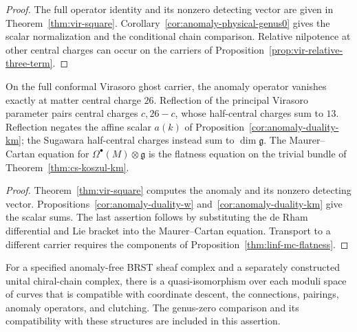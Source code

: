 \begin{proof}
The full operator identity and its nonzero detecting vector are given in Theorem~\ref{thm:vir-square}.
Corollary~\ref{cor:anomaly-physical-genus0} gives the scalar normalization and the conditional chain comparison.
Relative nilpotence at other central charges can occur on the carriers of Proposition~\ref{prop:vir-relative-three-term}.
\end{proof}

\begin{proposition}
\label{thm:anomaly-physical-km-w}
On the full conformal Virasoro ghost carrier, the anomaly operator vanishes exactly at matter central charge $26$.
Reflection of the principal Virasoro parameter pairs central charges $c,26-c$, whose half-central charges sum to $13$.
Reflection negates the affine scalar $a(k)$ of Proposition~\ref{cor:anomaly-duality-km}; the Sugawara half-central charges instead sum to $\dim\mathfrak g$.
The Maurer--Cartan equation for $\Omega^\bullet(M)\otimes\mathfrak g$ is the flatness equation on the trivial bundle of Theorem~\ref{thm:cs-koszul-km}.
\end{proposition}

\begin{proof}
Theorem~\ref{thm:vir-square} computes the anomaly and its nonzero detecting vector.
Propositions~\ref{cor:anomaly-duality-w} and~\ref{cor:anomaly-duality-km} give the scalar sums.
The last assertion follows by substituting the de Rham differential and Lie bracket into the Maurer--Cartan equation.
Transport to a different carrier requires the components of Proposition~\ref{thm:linf-mc-flatness}.
\end{proof}

\begin{conjecture}\label{conj:anomaly-physical}
For a specified anomaly-free BRST sheaf complex and a separately constructed unital chiral-chain complex, there is a quasi-isomorphism over each moduli space of curves that is compatible with coordinate descent, the connections, pairings, anomaly operators, and clutching.
The genus-zero comparison and its compatibility with these structures are included in this assertion.
\end{conjecture}

